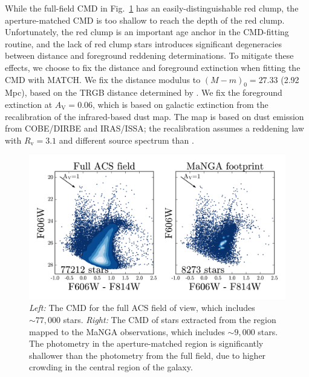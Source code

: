 \documentclass[preprint2]{aastex62}
\newcommand{\Av}{\ensuremath{A_{\mathrm{V}}}\xspace}
\newcommand{\dmod}{\ensuremath{(M - m)_0}\xspace}
\begin{document}
While the full-field CMD in Fig.~\ref{fig:cmd} has an easily-distinguishable red clump, the aperture-matched CMD is too shallow to reach the depth of the red clump. Unfortunately, the red clump is an important age anchor in the CMD-fitting routine, and the lack of red clump stars introduces significant degeneracies between distance and foreground reddening determinations. To mitigate these effects, we choose to fix the distance and foreground extinction when fitting the CMD with MATCH. We fix the distance modulus to $\dmod = 27.33$ (2.92\,Mpc), based on the TRGB distance determined by \citet{Dalcanton+2009}. We fix the foreground extinction at $\Av=0.06$, which is based on galactic extinction from the \citet{Schlafly+2011} recalibration of the \citet{Schlegel+1998} infrared-based dust map. The map is based on dust emission from COBE/DIRBE and IRAS/ISSA; the recalibration assumes a \citet{Fitzpatrick+1999} reddening law with $R_{\mathrm{v}} = 3.1$ and different source spectrum than \citet{Schlegel+1998}.

\begin{figure}
  \begin{center}
    \includegraphics[width=\linewidth]{figs/f2.png}
    \caption{\emph{Left:} The CMD for the full ACS field of view, which includes ${\sim}77,000$ stars. \emph{Right: } The CMD of stars extracted from the region mapped to the MaNGA observations, which includes ${\sim}9,000$ stars. The photometry in the aperture-matched region is significantly shallower than the photometry from the full field, due to higher crowding in the central region of the galaxy.}
    \label{fig:cmd}
  \end{center}
\end{figure}
\end{document}
